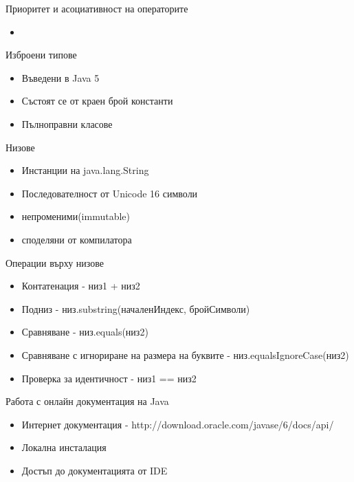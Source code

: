 \documentclass{beamer}
\begin{document}
\begin{frame}{Приоритет и асоциативност на операторите}
  \transdissolve
  \begin{itemize}
  \item 
  \end{itemize}
\end{frame}

\begin{frame}{Изброени типове}
  \transdissolve
  \begin{itemize}
  \item Въведени в Java 5
  \item Състоят се от краен брой константи
  \item Пълноправни класове 
  \end{itemize}
\end{frame}

\begin{frame}{Низове}
  \transdissolve
  \begin{itemize}
  \item Инстанции на java.lang.String
  \item Последователност от Unicode 16 символи
  \item непроменими(immutable)
  \item споделяни от компилатора
  \end{itemize}
\end{frame}

\begin{frame}{Операции върху низове}
  \transdissolve
  \begin{itemize}
  \item Контатенация - низ1 + низ2
  \item Подниз - низ.substring(началенИндекс, бройСимволи)
  \item Сравняване - низ.equals(низ2)
  \item Сравняване с игнориране на размера на буквите -
    низ.equalsIgnoreCase(низ2)
  \item Проверка за идентичност - низ1 == низ2
  \end{itemize}
\end{frame}

\begin{frame}{Работа с онлайн документация на Java}
  \transdissolve
  \begin{itemize}
  \item Интернет документация -
    http://download.oracle.com/javase/6/docs/api/
  \item Локална инсталация
  \item Достъп до документацията от IDE
  \end{itemize}
\end{frame}
\end{document}
